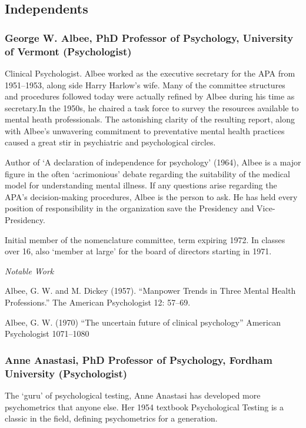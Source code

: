 \begin{refsection}
\subsection{Independents}
\label{independents}

\subsubsection{George W. Albee, PhD Professor of Psychology, University of Vermont (Psychologist)}
\label{georgew.albeephdprofessorofpsychologyuniversityofvermontpsychologist}

Clinical Psychologist. Albee worked as the executive secretary for the APA from 1951--1953, along side Harry Harlow's wife. Many of the committee structures and procedures followed today were actually refined by Albee during his time as secretary.In the 1950s, he chaired a task force to survey the resources available to mental heath professionals. The astonishing clarity of the resulting report, along with Albee's unwavering commitment to preventative mental health practices caused a great stir in psychiatric and psychological circles.

Author of `A declaration of independence for psychology' (1964), Albee is a major figure in the often `acrimonious' debate regarding the suitability of the medical model for understanding mental illness. If any questions arise regarding the APA's decision-making procedures, Albee is the person to ask. He has held every position of responsibility in the organization save the Presidency and Vice-Presidency.

Initial member of the nomenclature committee, term expiring 1972. In classes over 16, also `member at large' for the board of directors starting in 1971.

\emph{Notable Work}

Albee, G. W. and M. Dickey (1957). ``Manpower Trends in Three Mental Health Professions.'' The American Psychologist 12: 57--69.

Albee, G. W. (1970) “The uncertain future of clinical psychology” American Psychologist 1071--1080

\subsubsection{Anne Anastasi, PhD Professor of Psychology, Fordham University (Psychologist)}
\label{anneanastasiphdprofessorofpsychologyfordhamuniversitypsychologist}

The `guru' of psychological testing, Anne Anastasi has developed more psychometrics that anyone else. Her 1954 textbook Psychological Testing is a classic in the field, defining psychometrics for a generation.


\end{refsection}
